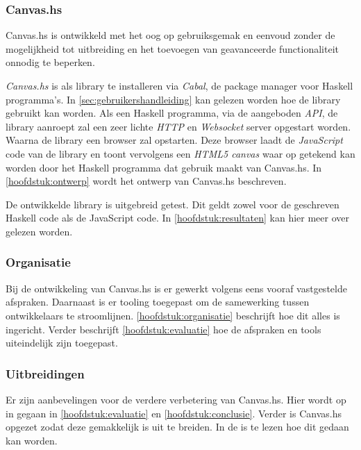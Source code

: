 \subsubsection{Canvas.hs}
Canvas.hs is ontwikkeld met het oog op gebruiksgemak en eenvoud zonder de mogelijkheid tot uitbreiding en het toevoegen van geavanceerde functionaliteit onnodig te beperken.

\emph{Canvas.hs} is als library te installeren via \emph{Cabal}, de package manager voor Haskell programma's. In \autoref{sec:gebruikershandleiding} kan gelezen worden hoe de library gebruikt kan worden. Als een Haskell programma, via de aangeboden \emph{API}, de library aanroept zal een zeer lichte \emph{HTTP} en \emph{Websocket} server opgestart worden. Waarna de library een browser zal opstarten. Deze browser laadt de \emph{JavaScript} code van de library en toont vervolgens een \emph{HTML5 canvas} waar op getekend kan worden door het Haskell programma dat gebruik maakt van Canvas.hs. In \autoref{hoofdstuk:ontwerp} wordt het ontwerp van Canvas.hs beschreven.

De ontwikkelde library is uitgebreid getest. Dit geldt zowel voor de geschreven Haskell code als de JavaScript code. In \autoref{hoofdstuk:resultaten} kan hier meer over gelezen worden.

\subsubsection{Organisatie}
Bij de ontwikkeling van Canvas.hs is er gewerkt volgens eens vooraf vastgestelde afspraken. Daarnaast is er tooling toegepast om de samewerking tussen ontwikkelaars te stroomlijnen. \autoref{hoofdstuk:organisatie} beschrijft hoe dit alles is ingericht. Verder beschrijft \autoref{hoofdstuk:evaluatie}  hoe de afspraken en tools uiteindelijk zijn toegepast.

\subsubsection{Uitbreidingen}
Er zijn aanbevelingen voor de verdere verbetering van Canvas.hs. Hier wordt op in gegaan in \autoref{hoofdstuk:evaluatie} en \autoref{hoofdstuk:conclusie}. Verder is Canvas.hs opgezet zodat deze gemakkelijk is uit te breiden. In de  is te lezen hoe dit gedaan kan worden.


